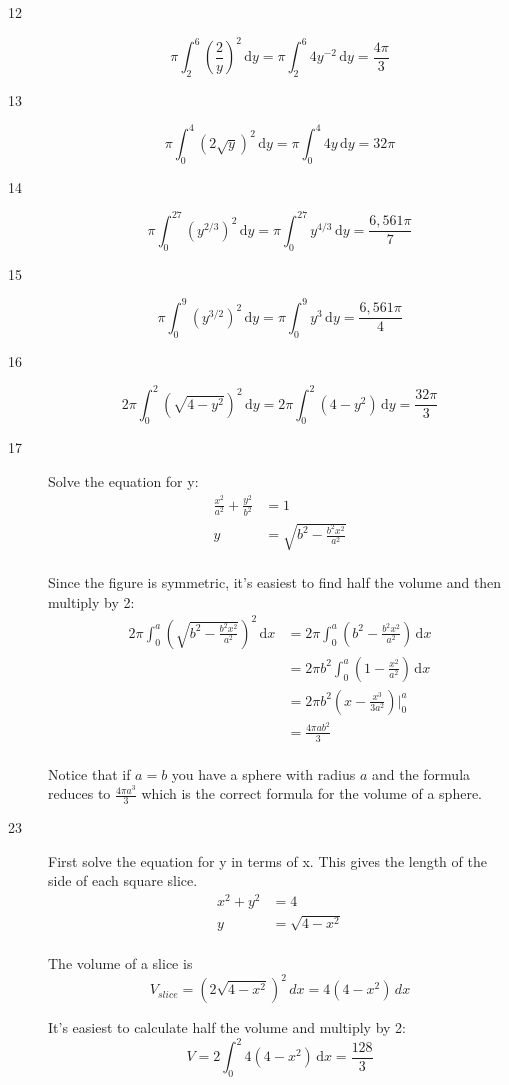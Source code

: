 \documentclass{exam}
\begin{document}
\begin{description}
\item[12]
\[
  \pi \int_2^6 \left( \frac{2}{y} \right)^2 \, \mathrm{d}y = \pi \int_2^6 4y^{-2} \, \mathrm{d}y = \frac{4 \pi}{3}
\]

\item[13]
\[
  \pi \int_0^4 \left( 2 \sqrt{y} \right)^2 \, \mathrm{d}y = \pi \int_0^4 4y \, \mathrm{d}y = 32 \pi
\]

\item[14]
\[
  \pi \int_0^{27} \left( y^{2/3} \right)^2 \, \mathrm{d}y = \pi \int_0^{27} y^{4/3} \, \mathrm{d}y = \frac{6,561 \pi}{7}
\]

\item[15]
\[
  \pi \int_0^9 \left( y^{3/2} \right)^2 \, \mathrm{d}y = \pi \int_0^9 y^3 \, \mathrm{d}y = \frac{6,561 \pi}{4}
\]

\item[16]
\[
  2 \pi \int_0^2 \left( \sqrt{4 - y^2} \right)^2 \, \mathrm{d}y = 2 \pi \int_0^2 (4 - y^2) \, \mathrm{d}y = \frac{32 \pi}{3}
\]

\item[17]
Solve the equation for y:
\begin{align*}
  \frac{x^2}{a^2} + \frac{y^2}{b^2} &= 1 \\
  y &= \sqrt{b^2 - \frac{b^2x^2}{a^2}} \\
\end{align*}

Since the figure is symmetric, it's easiest to find half the volume and then multiply by 2:
\begin{align*}
  2 \pi \int_0^a \left( \sqrt{b^2 - \frac{b^2x^2}{a^2}} \right)^2 \, \mathrm{d}x 
    &= 2 \pi \int_0^a \left( b^2 - \frac{b^2x^2}{a^2} \right) \, \mathrm{d}x \\
    &= 2 \pi b^2 \int_0^a \left(1 - \frac{x^2}{a^2} \right) \, \mathrm{d}x \\
    &= 2 \pi b^2 \left(x - \frac{x^3}{3a^2} \right) \bigg|_0^a \\
    &= \frac{4 \pi a b^2}{3} \\
\end{align*}

Notice that if $a = b$ you have a sphere with radius $a$ and the formula reduces to $\frac{4 \pi a^3}{3}$ which is the
correct formula for the volume of a sphere.

\item[23]

First solve the equation for y in terms of x.  This gives the length of the side of each square slice.
\begin{align*}
  x^2 + y^2 &= 4 \\
  y &= \sqrt{4 - x^2} \\
\end{align*}

The volume of a slice is
\[
  V_{slice} = \left( 2 \sqrt{4 - x^2} \right)^2 \, dx = 4(4 - x^2) \, dx
\]

It's easiest to calculate half the volume and multiply by 2:
\[
  V = 2 \int_0^2 4(4 - x^2) \, \mathrm{d}x = \frac{128}{3}
\]
\end{description}
\end{document}
